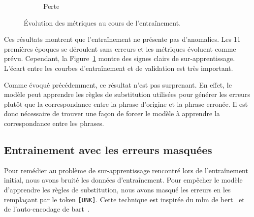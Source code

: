 \begin{figure}[hbt]
\begin{subfigure}{.5\textwidth}
\begin{center}
        \end{center}
        \caption{Perte}
        \label{fig.results.over.loss}
    \end{subfigure}
    \caption{Évolution des métriques au cours de l'entraînement.}
    \label{fig.results.over}
\end{figure}
Ces résultats montrent que l'entraînement ne présente pas d'anomalies.
Les 11 premières époques se déroulent sans erreurs et les métriques évoluent comme prévu.
Cependant, la Figure~\ref{fig.results.over.loss} montre des signes clairs de sur-apprentissage.
L'écart entre les courbes d'entraînement et de validation est très important.

Comme évoqué précédemment, ce résultat n'est pas surprenant.
En effet, le modèle peut apprendre les règles de substitution utilisées pour générer les erreurs
plutôt que la correspondance entre la phrase d'origine et la phrase erronée.
Il est donc nécessaire de trouver une façon de forcer le modèle à apprendre la correspondance entre les phrases.

\subsection{Entrainement avec les erreurs masquées}%
\label{sub.results.masking}

Pour remédier au problème de sur-apprentissage rencontré lors de l'entraînement initial,
nous avons bruité les données d'entraînement.
Pour empêcher le modèle d'apprendre les règles de substitution,
nous avons masqué les erreurs en les remplaçant par le token \verb|[UNK]|.
Cette technique est inspirée du \gls{mlm} de \gls{bert}~\cite{Devlin_Chang_Lee_Toutanova_2019}
et de l'auto-encodage de \gls{bart}~\cite{Lewis_Liu_Goyal_Ghazvininejad_Mohamed_Levy_Stoyanov_Zettlemoyer_2019}.

